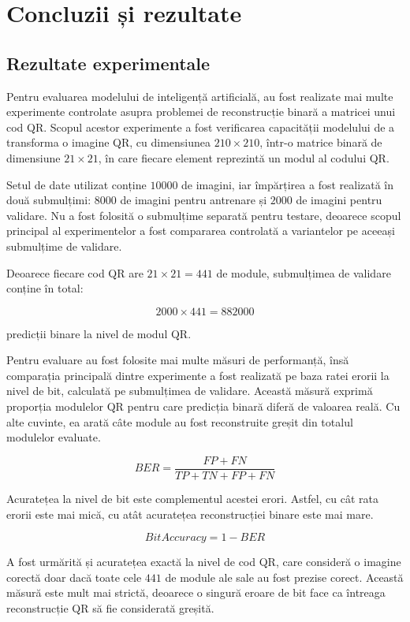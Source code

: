 \chapter{Concluzii și rezultate}

\section{Rezultate experimentale}

Pentru evaluarea modelului de inteligență artificială, au fost realizate mai multe experimente controlate asupra problemei de reconstrucție binară a matricei unui cod QR. Scopul acestor experimente a fost verificarea capacității modelului de a transforma o imagine QR, cu dimensiunea $210 \times 210$, într-o matrice binară de dimensiune $21 \times 21$, în care fiecare element reprezintă un modul al codului QR.

Setul de date utilizat conține $10000$ de imagini, iar împărțirea a fost realizată în două submulțimi: $8000$ de imagini pentru antrenare și $2000$ de imagini pentru validare. Nu a fost folosită o submulțime separată pentru testare, deoarece scopul principal al experimentelor a fost compararea controlată a variantelor pe aceeași submulțime de validare.

Deoarece fiecare cod QR are $21 \times 21 = 441$ de module, submulțimea de validare conține în total:

\[
    2000 \times 441 = 882000
\]

predicții binare la nivel de modul QR.

Pentru evaluare au fost folosite mai multe măsuri de performanță, însă comparația principală dintre experimente a fost realizată pe baza ratei erorii la nivel de bit, calculată pe submulțimea de validare. Această măsură exprimă proporția modulelor QR pentru care predicția binară diferă de valoarea reală. Cu alte cuvinte, ea arată câte module au fost reconstruite greșit din totalul modulelor evaluate.

\[
    BER = \frac{FP + FN}{TP + TN + FP + FN}
\]

Acuratețea la nivel de bit este complementul acestei erori. Astfel, cu cât rata erorii este mai mică, cu atât acuratețea reconstrucției binare este mai mare.

\[
    BitAccuracy = 1 - BER
\]

A fost urmărită și acuratețea exactă la nivel de cod QR, care consideră o imagine corectă doar dacă toate cele $441$ de module ale sale au fost prezise corect. Această măsură este mult mai strictă, deoarece o singură eroare de bit face ca întreaga reconstrucție QR să fie considerată greșită.

